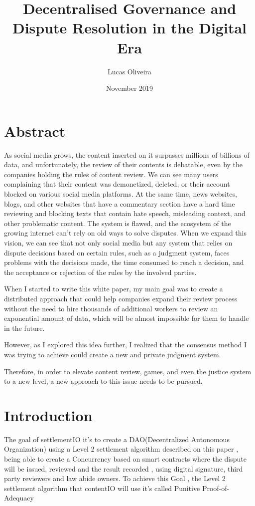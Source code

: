 \documentclass{article}
\title{Decentralised Governance and Dispute Resolution in the Digital Era}
\author{Lucas Oliveira}
\date{November 2019}
\begin{document}
\maketitle

\section*{Abstract}
As social media grows, the content inserted on it surpasses millions of billions of data, and unfortunately, the review of their contents is debatable, even by the companies holding the rules of content review. We can see many users complaining that their content was demonetized, deleted, or their account blocked on various social media platforms. At the same time, news websites, blogs, and other websites that have a commentary section have a hard time reviewing and blocking texts that contain hate speech, misleading context, and other problematic content. The system is flawed, and the ecosystem of the growing internet can't rely on old ways to solve disputes. When we expand this vision, we can see that not only social media but any system that relies on dispute decisions based on certain rules, such as a judgment system, faces problems with the decisions made, the time consumed to reach a decision, and the acceptance or rejection of the rules by the involved parties.

When I started to write this white paper, my main goal was to create a distributed approach that could help companies expand their review process without the need to hire thousands of additional workers to review an exponential amount of data, which will be almost impossible for them to handle in the future.

However, as I explored this idea further, I realized that the consensus method I was trying to achieve could create a new and private judgment system.

Therefore, in order to elevate content review, games, and even the justice system to a new level, a new approach to this issue needs to be pursued.


\section{Introduction}

The goal of settlementIO it's to create a DAO(Decentralized Autonomous Organization) using a Level 2 settlement algorithm described on this paper , being able to create a Concurrency based on smart contracts where the dispute will be issued, reviewed and the result recorded , using digital signature, third party reviewers and law abide owners. To achieve this Goal , the Level 2 settlement algorithm that contentIO will use it's called Punitive Proof-of-Adequacy
\end{document}
